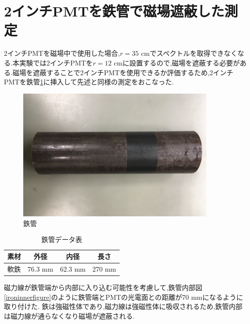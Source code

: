 \section{2インチPMTを鉄管で磁場遮蔽した測定}
2インチPMTを磁場中で使用した場合,$r=35$ cmでスペクトルを取得できなくなる.本実験では2インチPMTを$r=12$ cmに設置するので,磁場を遮蔽する必要がある.磁場を遮蔽することで2インチPMTを使用できるか評価するため,2インチPMTを鉄管\ref{ironpipe}に挿入して先述と同様の測定をおこなった.
\begin{figure}[tbp]
	\centering
		\includegraphics[width=10cm]{fig/iguchi/ironpipe.JPG}
	\caption{鉄管}
	\label{ironpipe}
\end{figure}

\begin{table}[tbp]
	\centering
	 \begin{tabular}{cccc} \hline
		素材 & 外径 & 内径 & 長さ \\ \hline \hline
		軟鉄 & 76.3 mm & 62.3 mm & 270 mm \\ \hline
	\end{tabular}
	  \caption{鉄管データ表}
	  \label{ironpipedata}
\end{table}

磁力線が鉄管端から内部に入り込む可能性を考慮して,鉄管内部図\ref{ironinnerfigure}のように鉄管端とPMTの光電面との距離が70 mmになるように取り付けた.
鉄は強磁性体であり,磁力線は強磁性体に吸収されるため,鉄管内部は磁力線が通らなくなり磁場が遮蔽される.

